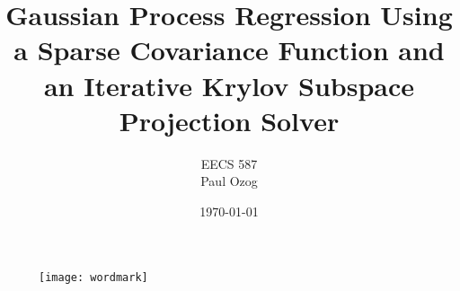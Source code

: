 \documentclass[11pt]{article}
\title{
  Gaussian Process Regression Using a Sparse Covariance Function and an Iterative Krylov
  Subspace Projection Solver
}
\date{\today}
\author{
  EECS 587 \\
  Paul Ozog
}
\begin{document}
  \begin{figure}
    \begin{center}
      \texttt{[image: wordmark]}
    \end{center}
  \end{figure}
  \maketitle
  \thispagestyle{empty}


\acresetall










\end{document}
